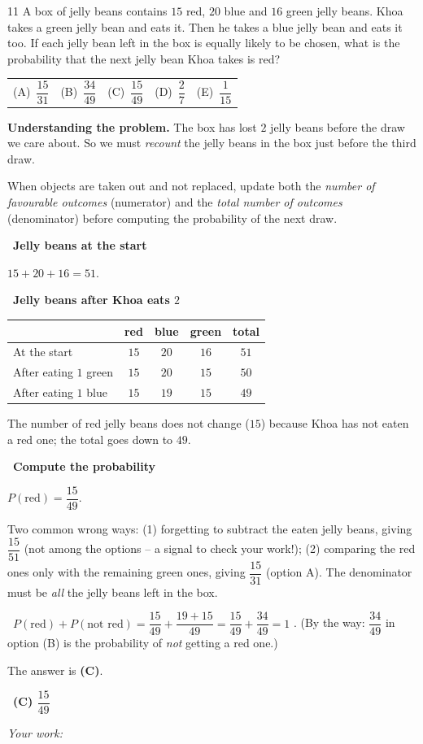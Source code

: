 \documentclass[11pt]{article}
\makeatletter
\newif\ifsol \solfalse
\providecommand{\AnsWord}{Đáp số}
\newcommand{\ans}[1]{\par\smallskip{\bfseries\color{tmGreen!88!black}\AnsWord:}\ {\bfseries\color{AnsRed}#1}\par}
\newcommand{\probsol}[1]{%
  \begin{lrbox}{\solmeasure}\begin{minipage}{\dimexpr\linewidth-24pt\relax}#1\end{minipage}\end{lrbox}%
  \ifsol
    \begin{solbox}#1\end{solbox}%
  \else
    \setlength{\solht}{\dimexpr\ht\solmeasure+\dp\solmeasure+0.85cm\relax}%
    \ifdim\solht<1.35cm\setlength{\solht}{1.35cm}\fi
    \ifdim\solht>\StudentMaxWork\setlength{\solht}{\StudentMaxWork}\fi
    \begin{tcolorbox}[colback=white,colframe=Line,boxrule=0.8pt,arc=5pt,
      left=8pt,right=8pt,top=4pt,bottom=4pt,height=\solht]{\footnotesize\color{Slate}\itshape\WorkWord}\end{tcolorbox}%
  \fi}
\newlength{\StudentMaxWork}\setlength{\StudentMaxWork}{7.5cm}
\newcommand{\step}[2]{\par\smallskip\noindent{\bfseries\color{tmBlue!85!black}\StepWord~#1.}\ {\bfseries #2}\par\nopagebreak}
\newcommand{\verify}[1]{\par\smallskip\noindent{\bfseries\color{tmGreen!80!black}\faCheckCircle\ \CheckWord}\ #1\par}
\newcommand{\choices}[5]{\par\smallskip\noindent
  \begin{tabularx}{\linewidth}{@{}XXXXX@{}}(A)\ #1&(B)\ #2&(C)\ #3&(D)\ #4&(E)\ #5\end{tabularx}\par}
\def\WorkWord{Your work:}
\def\AnsWord{Answer}
\def\StepWord{Step}
\def\CheckWord{Check:}
\makeatother
\begin{document}
\begin{probbox}{11}{\relax}
A box of jelly beans contains $15$ red, $20$ blue and $16$ green jelly beans. Khoa takes a green jelly bean and eats it. Then he takes a blue jelly bean and eats it too. If each jelly bean left in the box is equally likely to be chosen, what is the probability that the next jelly bean Khoa takes is red?
\choices{$\dfrac{15}{31}$}{$\dfrac{34}{49}$}{$\dfrac{15}{49}$}{$\dfrac{2}{7}$}{$\dfrac{1}{15}$}
\end{probbox}
\probsol{
\textbf{Understanding the problem.} The box has lost $2$ jelly beans before the draw we care about. So we must \emph{recount} the jelly beans in the box just before the third draw.
\begin{recallbox}When objects are taken out and not replaced, update both the \emph{number of favourable outcomes} (numerator) and the \emph{total number of outcomes} (denominator) before computing the probability of the next draw.\end{recallbox}
\step{1}{Jelly beans at the start}
$15+20+16=51$.
\step{2}{Jelly beans after Khoa eats $2$}
\begin{center}
\begin{tabular}{|l|c|c|c|c|}\hline
 & red & blue & green & total\\ \hline
At the start & $15$ & $20$ & $16$ & $51$\\ \hline
After eating $1$ green & $15$ & $20$ & $15$ & $50$\\ \hline
After eating $1$ blue & $15$ & $19$ & $15$ & $49$\\ \hline
\end{tabular}
\end{center}
The number of red jelly beans does not change ($15$) because Khoa has not eaten a red one; the total goes down to $49$.
\step{3}{Compute the probability}
$P(\text{red})=\dfrac{15}{49}$.
\begin{warnbox}Two common wrong ways: (1) forgetting to subtract the eaten jelly beans, giving $\dfrac{15}{51}$ (not among the options -- a signal to check your work!); (2) comparing the red ones only with the remaining green ones, giving $\dfrac{15}{31}$ (option A). The denominator must be \emph{all} the jelly beans left in the box.\end{warnbox}
\verify{$P(\text{red})+P(\text{not red})=\dfrac{15}{49}+\dfrac{19+15}{49}=\dfrac{15}{49}+\dfrac{34}{49}=1$ \checkmark. (By the way: $\dfrac{34}{49}$ in option (B) is the probability of \emph{not} getting a red one.)}
The answer is \textbf{(C)}.
\ans{(C) $\dfrac{15}{49}$}
}
\end{document}
